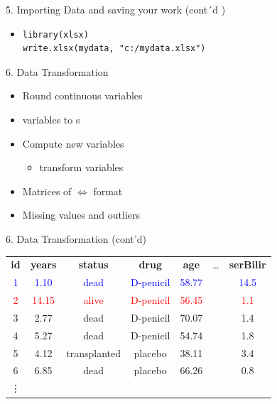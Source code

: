 \documentclass[14pt, aspectratio=169, sectionpage=simple, xclolor=table]{beamer}
\begin{document}
\begin{frame}[fragile]{5. Importing Data and saving your work (cont´d )}
\begin{itemize}
\item {}
\begin{verbatim}
library(xlsx)
write.xlsx(mydata, "c:/mydata.xlsx")
\end{verbatim}
\end{itemize}
\end{frame}

\begin{frame}[fragile]{6. Data Transformation}
\begin{itemize}
	\item Round continuous variables
	\nl
	\item {} variables to s
	\nl
	\item Compute new variables
	\begin{itemize}
		\item transform variables
		\nl
	\end{itemize}
	\item Matrices of  $\Leftrightarrow$  format
	\nl
	\item Missing values and outliers
\end{itemize}
\end{frame}
\begin{frame}[fragile]{6. Data Transformation (cont'd)}
\begin{tabular}{ccccccc}
\textbf{id} &  \textbf{years} &  \textbf{status}  &  \textbf{drug} &  \textbf{age} & \dots &  \textbf{serBilir} \\
\textcolor{blue}{1}& \textcolor{blue}{1.10} & \textcolor{blue}{dead}&  \textcolor{blue}{ D-penicil} & \textcolor{blue}{58.77} & & \textcolor{blue}{14.5} \\
\textcolor{red}{2}& \textcolor{red}{14.15}& \textcolor{red}{alive}&   \textcolor{red}{D-penicil} & \textcolor{red}{56.45} & & \textcolor{red}{1.1}\\
3& 2.77& dead& D-penicil & 70.07 & & 1.4\\
4& 5.27& dead& D-penicil & 54.74 & & 1.8\\
5& 4.12& transplanted&   placebo & 38.11 & & 3.4\\                                                   
6& 6.85& dead&   placebo & 66.26 & & 0.8\\
\vdots &&&&&&
\end{tabular}
\end{frame}
\end{document}
